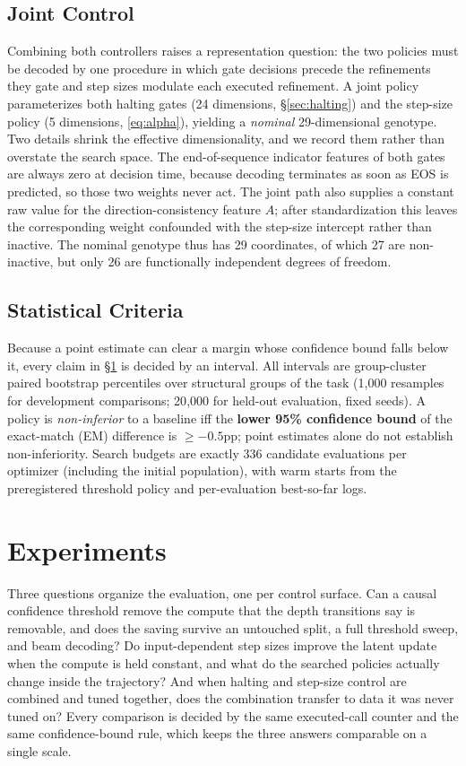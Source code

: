 ﻿\documentclass[11pt]{article}
\begin{document}
\subsection{Joint Control}
Combining both controllers raises a representation question: the two policies must be decoded by one procedure in which gate decisions precede the refinements they gate and step sizes modulate each executed refinement. A joint policy parameterizes both halting gates (24 dimensions, \S\ref{sec:halting}) and the step-size policy (5 dimensions, \eqref{eq:alpha}), yielding a \emph{nominal} 29-dimensional genotype. Two details shrink the effective dimensionality, and we record them rather than overstate the search space. The end-of-sequence indicator features of both gates are always zero at decision time, because decoding terminates as soon as EOS is predicted, so those two weights never act. The joint path also supplies a constant raw value for the direction-consistency feature $A$; after standardization this leaves the corresponding weight confounded with the step-size intercept rather than inactive. The nominal genotype thus has 29 coordinates, of which 27 are non-inactive, but only 26 are functionally independent degrees of freedom.

\subsection{Statistical Criteria}
\label{sec:stats}
Because a point estimate can clear a margin whose confidence bound falls below it, every claim in \S\ref{sec:experiments} is decided by an interval. All intervals are group-cluster paired bootstrap percentiles \citep{cameron2015practitioner} over structural groups of the task (1{,}000 resamples for development comparisons; 20{,}000 for held-out evaluation, fixed seeds). A policy is \emph{non-inferior} to a baseline iff the \textbf{lower 95\% confidence bound} of the exact-match (EM) difference is $\geq -0.5$pp; point estimates alone do not establish non-inferiority. Search budgets are exactly 336 candidate evaluations per optimizer (including the initial population), with warm starts from the preregistered threshold policy and per-evaluation best-so-far logs.

\section{Experiments}
\label{sec:experiments}

Three questions organize the evaluation, one per control surface. Can a causal confidence threshold remove the compute that the depth transitions say is removable, and does the saving survive an untouched split, a full threshold sweep, and beam decoding? Do input-dependent step sizes improve the latent update when the compute is held constant, and what do the searched policies actually change inside the trajectory? And when halting and step-size control are combined and tuned together, does the combination transfer to data it was never tuned on? Every comparison is decided by the same executed-call counter and the same confidence-bound rule, which keeps the three answers comparable on a single scale.
\end{document}
